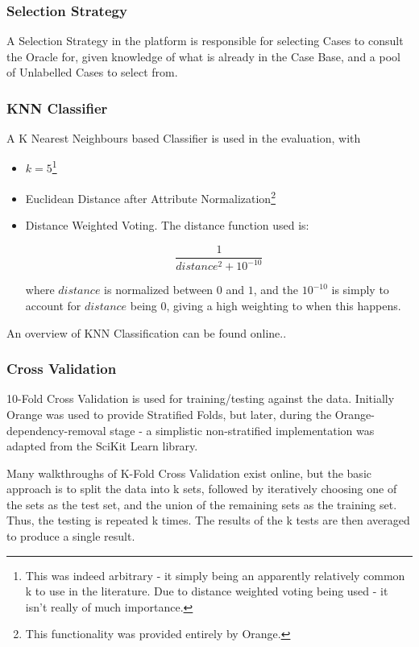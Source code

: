 \documentclass[a4paper,11pt]{report}
\begin{document}
\subsubsection{Selection Strategy}

A Selection Strategy in the platform is responsible for selecting Cases to consult the Oracle for, given knowledge of what is already in the Case Base, and a pool of Unlabelled Cases to select from.

\subsubsection{KNN Classifier}
A K Nearest Neighbours based Classifier is used in the evaluation, with 
\begin{itemize}
	\item $k=5$\footnote{This was indeed arbitrary - it simply being an apparently relatively common k to use in the literature. Due to distance weighted voting being used - it isn't really of much importance.} 
	\item Euclidean Distance after Attribute Normalization\footnote {This functionality was provided entirely by Orange.}
	\item Distance Weighted Voting. The distance function used is:
	
	\[
	\frac{1}{distance^{2}+10^{-10}}
	\]
	
	where $distance$ is normalized between $0$ and $1$, and the $10^{-10}$ is simply to account for $distance$ being $0$, giving a high weighting to when this happens.
	
	
\end{itemize}

An overview of KNN Classification can be found online.\cite{web:knntut}.

\subsubsection{Cross Validation}

10-Fold Cross Validation is used for training/testing against the data. Initially Orange was used to provide Stratified Folds, but later, during the Orange-dependency-removal stage - a simplistic non-stratified implementation was adapted from the SciKit Learn library\cite{prog:sklearn}.

Many walkthroughs of K-Fold Cross Validation exist online\cite{web:kfolddemo}, but the basic approach is to split the data into k sets, followed by iteratively choosing one of the sets as the test set, and the union of the remaining sets as the training set. Thus, the testing is repeated k times. The results of the k tests are then averaged to produce a single result.
\end{document}
